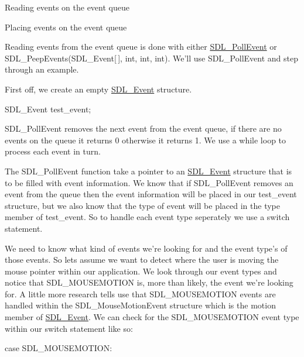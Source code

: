 Reading events on the event queue 

Placing events on the event queue 

Reading events from the event queue is done with either \hyperlink{_sdl_8cs_a85f90a4d8d6ae6e2ab13c9e286a9afd2}{SDL\_\-PollEvent} or SDL\_\-PeepEvents(SDL\_\-Event\mbox{[}$\,$\mbox{]}, int, int, int). We'll use SDL\_\-PollEvent and step through an example. 

First off, we create an empty \hyperlink{struct_tao_1_1_sdl_1_1_s_d_l___event}{SDL\_\-Event} structure. 


\begin{DoxyCode}
SDL_Event test_event;
\end{DoxyCode}
 

SDL\_\-PollEvent removes the next event from the event queue, if there are no events on the queue it returns 0 otherwise it returns 1. We use a while loop to process each event in turn. 


\begin{DoxyCode}
while(SDL_PollEvent(&amp;test_event)) { 
\end{DoxyCode}
 

The SDL\_\-PollEvent function take a pointer to an \hyperlink{struct_tao_1_1_sdl_1_1_s_d_l___event}{SDL\_\-Event} structure that is to be filled with event information. We know that if SDL\_\-PollEvent removes an event from the queue then the event information will be placed in our test\_\-event structure, but we also know that the type of event will be placed in the type member of test\_\-event. So to handle each event type seperately we use a switch statement. 


\begin{DoxyCode}
 switch(test_event.type) { 
\end{DoxyCode}
 

We need to know what kind of events we're looking for and the event type's of those events. So lets assume we want to detect where the user is moving the mouse pointer within our application. We look through our event types and notice that SDL\_\-MOUSEMOTION is, more than likely, the event we're looking for. A little more research tells use that SDL\_\-MOUSEMOTION events are handled within the SDL\_\-MouseMotionEvent structure which is the motion member of \hyperlink{struct_tao_1_1_sdl_1_1_s_d_l___event}{SDL\_\-Event}. We can check for the SDL\_\-MOUSEMOTION event type within our switch statement like so:  


\begin{DoxyCode}
case SDL_MOUSEMOTION:
\end{DoxyCode}
 

